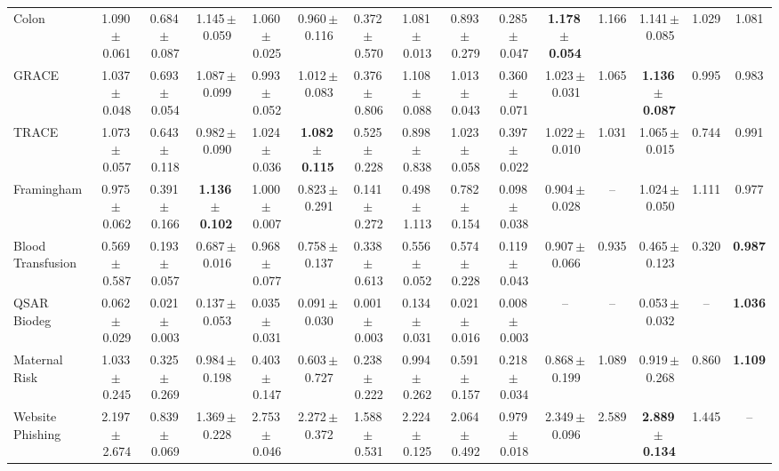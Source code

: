 \documentclass[8pt]{extarticle}
\begin{document}
\begin{longtable}{l*{14}{c}}
Colon & 1.090\,$\pm$\,0.061 & 0.684\,$\pm$\,0.087 & 1.145\,$\pm$\,0.059 & 1.060\,$\pm$\,0.025 & 0.960\,$\pm$\,0.116 & 0.372\,$\pm$\,0.570 & 1.081\,$\pm$\,0.013 & 0.893\,$\pm$\,0.279 & 0.285\,$\pm$\,0.047 & \textbf{1.178\,$\pm$\,0.054} & 1.166 & 1.141\,$\pm$\,0.085 & 1.029 & 1.081 \\
GRACE & 1.037\,$\pm$\,0.048 & 0.693\,$\pm$\,0.054 & 1.087\,$\pm$\,0.099 & 0.993\,$\pm$\,0.052 & 1.012\,$\pm$\,0.083 & 0.376\,$\pm$\,0.806 & 1.108\,$\pm$\,0.088 & 1.013\,$\pm$\,0.043 & 0.360\,$\pm$\,0.071 & 1.023\,$\pm$\,0.031 & 1.065 & \textbf{1.136\,$\pm$\,0.087} & 0.995 & 0.983 \\
TRACE & 1.073\,$\pm$\,0.057 & 0.643\,$\pm$\,0.118 & 0.982\,$\pm$\,0.090 & 1.024\,$\pm$\,0.036 & \textbf{1.082\,$\pm$\,0.115} & 0.525\,$\pm$\,0.228 & 0.898\,$\pm$\,0.838 & 1.023\,$\pm$\,0.058 & 0.397\,$\pm$\,0.022 & 1.022\,$\pm$\,0.010 & 1.031 & 1.065\,$\pm$\,0.015 & 0.744 & 0.991 \\
Framingham & 0.975\,$\pm$\,0.062 & 0.391\,$\pm$\,0.166 & \textbf{1.136\,$\pm$\,0.102} & 1.000\,$\pm$\,0.007 & 0.823\,$\pm$\,0.291 & 0.141\,$\pm$\,0.272 & 0.498\,$\pm$\,1.113 & 0.782\,$\pm$\,0.154 & 0.098\,$\pm$\,0.038 & 0.904\,$\pm$\,0.028 & -- & 1.024\,$\pm$\,0.050 & 1.111 & 0.977 \\
Blood Transfusion & 0.569\,$\pm$\,0.587 & 0.193\,$\pm$\,0.057 & 0.687\,$\pm$\,0.016 & 0.968\,$\pm$\,0.077 & 0.758\,$\pm$\,0.137 & 0.338\,$\pm$\,0.613 & 0.556\,$\pm$\,0.052 & 0.574\,$\pm$\,0.228 & 0.119\,$\pm$\,0.043 & 0.907\,$\pm$\,0.066 & 0.935 & 0.465\,$\pm$\,0.123 & 0.320 & \textbf{0.987} \\
QSAR Biodeg & 0.062\,$\pm$\,0.029 & 0.021\,$\pm$\,0.003 & 0.137\,$\pm$\,0.053 & 0.035\,$\pm$\,0.031 & 0.091\,$\pm$\,0.030 & 0.001\,$\pm$\,0.003 & 0.134\,$\pm$\,0.031 & 0.021\,$\pm$\,0.016 & 0.008\,$\pm$\,0.003 & -- & -- & 0.053\,$\pm$\,0.032 & -- & \textbf{1.036} \\
Maternal Risk & 1.033\,$\pm$\,0.245 & 0.325\,$\pm$\,0.269 & 0.984\,$\pm$\,0.198 & 0.403\,$\pm$\,0.147 & 0.603\,$\pm$\,0.727 & 0.238\,$\pm$\,0.222 & 0.994\,$\pm$\,0.262 & 0.591\,$\pm$\,0.157 & 0.218\,$\pm$\,0.034 & 0.868\,$\pm$\,0.199 & 1.089 & 0.919\,$\pm$\,0.268 & 0.860 & \textbf{1.109} \\
Website Phishing & 2.197\,$\pm$\,2.674 & 0.839\,$\pm$\,0.069 & 1.369\,$\pm$\,0.228 & 2.753\,$\pm$\,0.046 & 2.272\,$\pm$\,0.372 & 1.588\,$\pm$\,0.531 & 2.224\,$\pm$\,0.125 & 2.064\,$\pm$\,0.492 & 0.979\,$\pm$\,0.018 & 2.349\,$\pm$\,0.096 & 2.589 & \textbf{2.889\,$\pm$\,0.134} & 1.445 & -- \\
\end{longtable}
\end{document}
